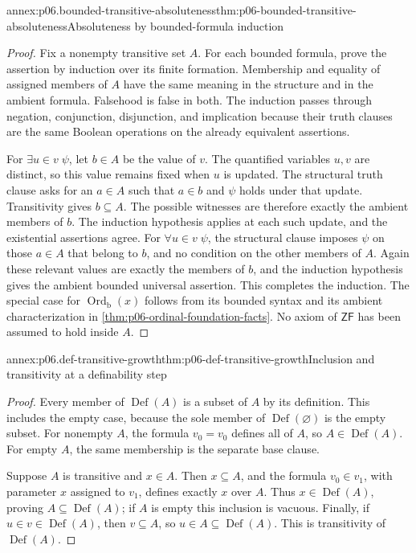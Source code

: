 \begin{annexitem}{annex:p06.bounded-transitive-absoluteness}{thm:p06-bounded-transitive-absoluteness}{Absoluteness by bounded-formula induction}
\begin{proof}
Fix a nonempty transitive set \(A\).  For each bounded formula,
prove the assertion by induction over its finite formation.
Membership and equality of assigned members of \(A\) have the
same meaning in the structure and in the ambient formula.
Falsehood is false in both.  The induction passes through
negation, conjunction, disjunction, and implication because
their truth clauses are the same Boolean operations on the
already equivalent assertions.

For \(\exists u\in v\;\psi\), let \(b\in A\) be the value of
\(v\).  The quantified variables \(u,v\) are distinct, so this
value remains fixed when \(u\) is updated.  The structural truth
clause asks for an \(a\in A\) such that \(a\in b\) and \(\psi\)
holds under that update.  Transitivity gives \(b\subseteq A\).
The possible witnesses are therefore exactly the ambient members
of \(b\).  The induction hypothesis applies at each such update,
and the existential assertions agree.  For
\(\forall u\in v\;\psi\), the structural clause imposes \(\psi\)
on those \(a\in A\) that belong to \(b\), and no condition on
the other members of \(A\).  Again these relevant values are
exactly the members of \(b\), and the induction hypothesis gives
the ambient bounded universal assertion.
This completes the induction.  The special case for
\(\operatorname{Ord}_{\mathrm b}(x)\) follows from its bounded
syntax and its ambient characterization in
\cref{thm:p06-ordinal-foundation-facts}.  No axiom of \(\mathsf{ZF}\)
has been assumed to hold inside \(A\).
\end{proof}
\end{annexitem}

\begin{annexitem}{annex:p06.def-transitive-growth}{thm:p06-def-transitive-growth}{Inclusion and transitivity at a definability step}
\begin{proof}
Every member of \(\operatorname{Def}(A)\) is a subset of \(A\)
by its definition.  This includes the empty case, because the
sole member of \(\operatorname{Def}(\varnothing)\) is the empty
subset.  For nonempty \(A\), the formula \(v_0=v_0\) defines
all of \(A\), so \(A\in\operatorname{Def}(A)\).  For empty
\(A\), the same membership is the separate base clause.

Suppose \(A\) is transitive and \(x\in A\).  Then
\(x\subseteq A\), and the formula \(v_0\in v_1\), with
parameter \(x\) assigned to \(v_1\), defines exactly \(x\)
over \(A\).  Thus \(x\in\operatorname{Def}(A)\), proving
\(A\subseteq\operatorname{Def}(A)\); if \(A\) is empty this
inclusion is vacuous.  Finally, if
\(u\in v\in\operatorname{Def}(A)\), then \(v\subseteq A\),
so \(u\in A\subseteq\operatorname{Def}(A)\).
This is transitivity of \(\operatorname{Def}(A)\).
\end{proof}
\end{annexitem}

